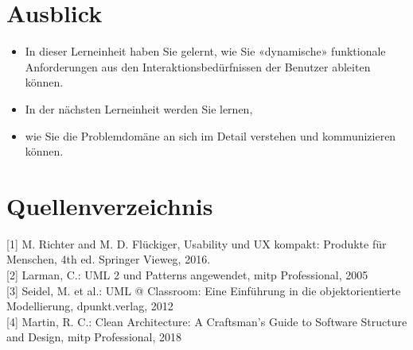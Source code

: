 \documentclass[10pt]{article}
\begin{document}
\section*{Ausblick}
\begin{itemize}
  \item In dieser Lerneinheit haben Sie gelernt, wie Sie «dynamische» funktionale Anforderungen aus den Interaktionsbedürfnissen der Benutzer ableiten können.
  \item In der nächsten Lerneinheit werden Sie lernen,
  \item wie Sie die Problemdomäne an sich im Detail verstehen und kommunizieren können.
\end{itemize}

\section*{Quellenverzeichnis}
[1] M. Richter and M. D. Flückiger, Usability und UX kompakt: Produkte für Menschen, 4th ed. Springer Vieweg, 2016.\\[0pt]
[2] Larman, C.: UML 2 und Patterns angewendet, mitp Professional, 2005\\[0pt]
[3] Seidel, M. et al.: UML @ Classroom: Eine Einführung in die objektorientierte Modellierung, dpunkt.verlag, 2012\\[0pt]
[4] Martin, R. C.: Clean Architecture: A Craftsman's Guide to Software Structure and Design, mitp Professional, 2018
\end{document}
